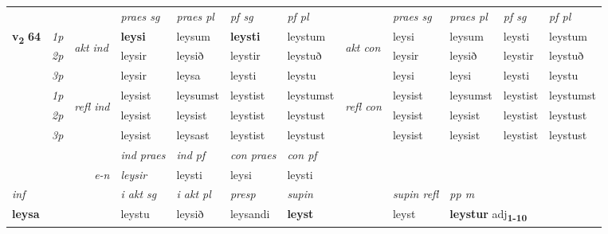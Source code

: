 \begin{longtable}[l]{X>{\footnotesize\itshape}llXXXXlXXXX}
\midrule

 & &   & \textit{praes sg}  & \textit{praes pl}    & \textit{ pf sg} & \textit{pf pl} & & \textit{praes sg}  & \textit{praes pl}    & \textit{pf sg} & \textit{pf pl }  \\ \cmidrule{4-7} \cmidrule{9-12}
 \multirow{2}{*}{{{\textbf{v{\textsubscript{2}}} \Large{\textbf{64}}}}}  & 1p & \multirow{3}{*}{\begin{turn}{90}\textit{akt ind}\end{turn}} & \textbf{leysi} & leysum & \textbf{leysti} & leystum & \multirow{3}{*}{\begin{turn}{90}\textit{akt con}\end{turn}} &leysi & leysum & leysti & leystum\\*
 & 2p &  &  leysir  & leysið & leystir & leystuð & & leysir & leysið & leystir & leystuð \\*
 & 3p &  & leysir & leysa & leysti & leystu & & leysi & leysi& leysti & leystu \\*
\cmidrule{4-7} \cmidrule{9-12}
 & 1p & \multirow{3}{*}{\begin{turn}{90}\textit{refl ind}\end{turn}}  & leysist & leysumst & leystist & leystumst & \multirow{3}{*}{\begin{turn}{90}\textit{refl con}\end{turn}}  &leysist & leysumst & leystist & leystumst \\*
 & 2p &  & leysist & leysist & leystist & leystust & &leysist & leysist & leystist & leystust \\*
 & 3p  & & leysist & leysast & leystist & leystust & & leysist & leysist& leystist & leystust \\*
\cmidrule{4-7} \cmidrule{9-12}

   && &  \textit{ind praes} & \textit{ind pf} & \textit{con praes} & \textit{con pf} \\*
\multicolumn{3}{r}{\textit{e-n}} & leysir & leysti & leysi & leysti \\*

\cmidrule{4-7}
   {\textit{inf}} & &  & \textit{i akt sg} & \textit{i akt pl}   & \textit{presp} & \textit{supin} && \textit{supin refl} & \textit{pp m} \\*
  {\textbf{leysa}} & && leystu  & leysið   & leysandi &  \textbf{leyst} && leyst & \multicolumn{2}{l}{\textbf{leystur} adj\textbf{\textsubscript{1-10}}} \\*

\midrule


\end{longtable}
